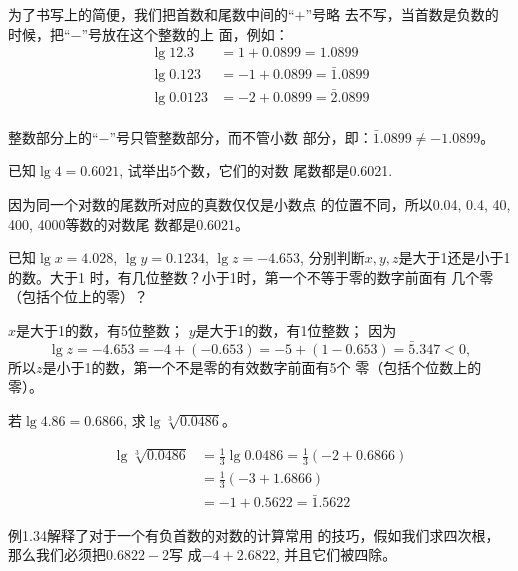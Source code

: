 为了书写上的简便，我们把首数和尾数中间的“$+$”号略
去不写，当首数是负数的时候，把“$-$”号放在这个整数的上
面，例如：
\[\begin{split}
    \lg 12.3&=1+0.0899=1.0899\\
    \lg 0.123&=-1+0.0899=\bar{1}.0899\\
    \lg 0.0123&=-2+0.0899=\bar{2}.0899\\
\end{split}\]

\begin{rmk}
   整数部分上的“$-$”号只管整数部分，而不管小数
部分，即：$\bar{1}.0899\ne -1.0899$。
\end{rmk}


\begin{example}
    已知$\lg4=0.6021$, 试举出5个数，它们的对数
    尾数都是0.6021.
\end{example}

\begin{solution}
    因为同一个对数的尾数所对应的真数仅仅是小数点
的位置不同，所以0.04, 0.4, 40, 400, 4000等数的对数尾
数都是0.6021。
\end{solution}

\begin{example}
    已知$\lg x=4.028$, $\lg y=0.1234$, $\lg z=-4.653$,
    分别判断$x,y,z$是大于1还是小于1的数。大于1
    时，有几位整数？小于1时，第一个不等于零的数字前面有
    几个零（包括个位上的零）？
\end{example}

\begin{solution}
    $x$是大于1的数，有5位整数；
$y$是大于1的数，有1位整数；
因为
\[
    \lg z=-4.653=-4+(-0.653)=-5+(1-0.653)=\bar{5}.347<0,
\]
所以$z$是小于1的数，第一个不是零的有效数字前面有5个
零（包括个位数上的零）。
\end{solution}


\begin{example}
    若$\lg4.86=0.6866$, 求$\lg\sqrt[3]{0.0486}$。
\end{example}


\begin{solution}
\[\begin{split}
    \lg\sqrt[3]{0.0486}&=\frac{1}{3}\lg0.0486=\frac{1}{3}(-2+0.6866)\\
    &=\frac{1}{3}(-3+1.6866)\\
    &=-1+0.5622=\bar{1}.5622
\end{split}\]
\end{solution}

\begin{rmk}
    例1.34解释了对于一个有负首数的对数的计算常用
的技巧，假如我们求四次根，那么我们必须把$0.6822-2$写
成$-4+2.6822$, 并且它们被四除。
\end{rmk}

